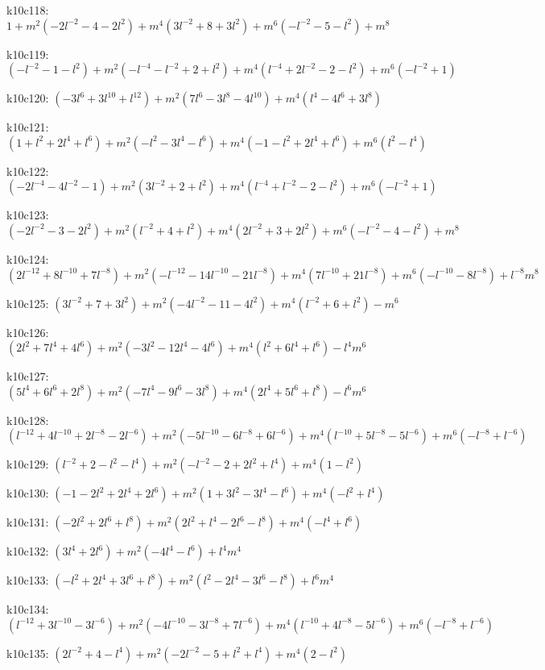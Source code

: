 k10c118: $ 1  +m^{2}(-2l^{-2}-4-2l^{2})  +m^{4}(3l^{-2}+8+3l^{2})  +m^{6}(-l^{-2}-5-l^{2})  +m^{8} $ 

k10c119: $ (-l^{-2}-1-l^{2})  +m^{2}(-l^{-4}-l^{-2}+2+l^{2})  +m^{4}(l^{-4}+2l^{-2}-2-l^{2})  +m^{6}(-l^{-2}+1) $ 

k10c120: $ (-3l^{6}+3l^{10}+l^{12})  +m^{2}(7l^{6}-3l^{8}-4l^{10})  +m^{4}(l^{4}-4l^{6}+3l^{8}) $ 

k10c121: $ (1+l^{2}+2l^{4}+l^{6})  +m^{2}(-l^{2}-3l^{4}-l^{6})  +m^{4}(-1-l^{2}+2l^{4}+l^{6})  +m^{6}(l^{2}-l^{4}) $ 

k10c122: $ (-2l^{-4}-4l^{-2}-1)  +m^{2}(3l^{-2}+2+l^{2})  +m^{4}(l^{-4}+l^{-2}-2-l^{2})  +m^{6}(-l^{-2}+1) $ 

k10c123: $ (-2l^{-2}-3-2l^{2})  +m^{2}(l^{-2}+4+l^{2})  +m^{4}(2l^{-2}+3+2l^{2})  +m^{6}(-l^{-2}-4-l^{2})  +m^{8} $ 

k10c124: $ (2l^{-12}+8l^{-10}+7l^{-8})  +m^{2}(-l^{-12}-14l^{-10}-21l^{-8})  +m^{4}(7l^{-10}+21l^{-8})  +m^{6}(-l^{-10}-8l^{-8})  +l^{-8}m^{8} $ 

k10c125: $ (3l^{-2}+7+3l^{2})  +m^{2}(-4l^{-2}-11-4l^{2})  +m^{4}(l^{-2}+6+l^{2})  -m^{6} $ 

k10c126: $ (2l^{2}+7l^{4}+4l^{6})  +m^{2}(-3l^{2}-12l^{4}-4l^{6})  +m^{4}(l^{2}+6l^{4}+l^{6})  -l^{4}m^{6} $ 

k10c127: $ (5l^{4}+6l^{6}+2l^{8})  +m^{2}(-7l^{4}-9l^{6}-3l^{8})  +m^{4}(2l^{4}+5l^{6}+l^{8})  -l^{6}m^{6} $ 

k10c128: $ (l^{-12}+4l^{-10}+2l^{-8}-2l^{-6})  +m^{2}(-5l^{-10}-6l^{-8}+6l^{-6})  +m^{4}(l^{-10}+5l^{-8}-5l^{-6})  +m^{6}(-l^{-8}+l^{-6}) $ 

k10c129: $ (l^{-2}+2-l^{2}-l^{4})  +m^{2}(-l^{-2}-2+2l^{2}+l^{4})  +m^{4}(1-l^{2}) $ 

k10c130: $ (-1-2l^{2}+2l^{4}+2l^{6})  +m^{2}(1+3l^{2}-3l^{4}-l^{6})  +m^{4}(-l^{2}+l^{4}) $ 

k10c131: $ (-2l^{2}+2l^{6}+l^{8})  +m^{2}(2l^{2}+l^{4}-2l^{6}-l^{8})  +m^{4}(-l^{4}+l^{6}) $ 

k10c132: $ (3l^{4}+2l^{6})  +m^{2}(-4l^{4}-l^{6})  +l^{4}m^{4} $ 

k10c133: $ (-l^{2}+2l^{4}+3l^{6}+l^{8})  +m^{2}(l^{2}-2l^{4}-3l^{6}-l^{8})  +l^{6}m^{4} $ 

k10c134: $ (l^{-12}+3l^{-10}-3l^{-6})  +m^{2}(-4l^{-10}-3l^{-8}+7l^{-6})  +m^{4}(l^{-10}+4l^{-8}-5l^{-6})  +m^{6}(-l^{-8}+l^{-6}) $ 

k10c135: $ (2l^{-2}+4-l^{4})  +m^{2}(-2l^{-2}-5+l^{2}+l^{4})  +m^{4}(2-l^{2}) $ 

